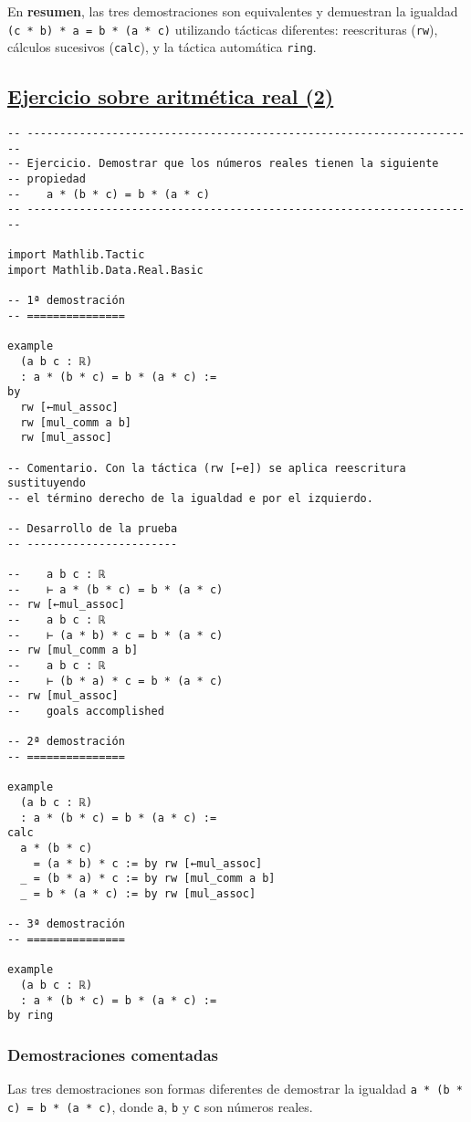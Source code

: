 En \textbf{resumen}, las tres demostraciones son equivalentes y demuestran la
igualdad \texttt{(c * b) * a = b * (a * c)} utilizando tácticas diferentes:
reescrituras (\texttt{rw}), cálculos sucesivos (\texttt{calc}), y la táctica automática
\texttt{ring}.

\subsection{\href{./src/Basicos/Ejercicio\_sobre\_aritmetica\_real\_2.lean}{Ejercicio sobre aritmética real (2)}}
\label{sec:orgb8b4d72}
\begin{verbatim}
-- ---------------------------------------------------------------------
-- Ejercicio. Demostrar que los números reales tienen la siguiente
-- propiedad
--    a * (b * c) = b * (a * c)
-- ---------------------------------------------------------------------

import Mathlib.Tactic
import Mathlib.Data.Real.Basic

-- 1ª demostración
-- ===============

example
  (a b c : ℝ)
  : a * (b * c) = b * (a * c) :=
by
  rw [←mul_assoc]
  rw [mul_comm a b]
  rw [mul_assoc]

-- Comentario. Con la táctica (rw [←e]) se aplica reescritura sustituyendo
-- el término derecho de la igualdad e por el izquierdo.

-- Desarrollo de la prueba
-- -----------------------

--    a b c : ℝ
--    ⊢ a * (b * c) = b * (a * c)
-- rw [←mul_assoc]
--    a b c : ℝ
--    ⊢ (a * b) * c = b * (a * c)
-- rw [mul_comm a b]
--    a b c : ℝ
--    ⊢ (b * a) * c = b * (a * c)
-- rw [mul_assoc]
--    goals accomplished

-- 2ª demostración
-- ===============

example
  (a b c : ℝ)
  : a * (b * c) = b * (a * c) :=
calc
  a * (b * c)
    = (a * b) * c := by rw [←mul_assoc]
  _ = (b * a) * c := by rw [mul_comm a b]
  _ = b * (a * c) := by rw [mul_assoc]

-- 3ª demostración
-- ===============

example
  (a b c : ℝ)
  : a * (b * c) = b * (a * c) :=
by ring
\end{verbatim}
\subsubsection*{Demostraciones comentadas}

Las tres demostraciones son formas diferentes de demostrar la igualdad
\texttt{a * (b * c) = b * (a * c)}, donde \texttt{a}, \texttt{b} y \texttt{c} son números reales.

